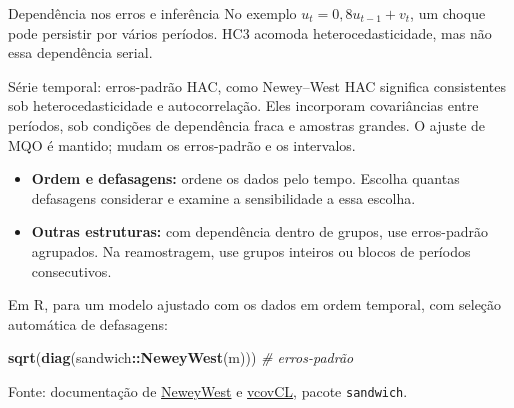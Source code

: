 \documentclass[
  ignorenonframetext,
  brazilian,
  aspectratio=169,
  10pt]{beamer}
\newenvironment{Shaded}{\begin{snugshade}}{\end{snugshade}}
\newcommand{\CommentTok}[1]{\textcolor[rgb]{0.56,0.35,0.01}{\textit{#1}}}
\newcommand{\FunctionTok}[1]{\textcolor[rgb]{0.13,0.29,0.53}{\textbf{#1}}}
\newcommand{\NormalTok}[1]{#1}
\newcommand{\SpecialCharTok}[1]{\textcolor[rgb]{0.81,0.36,0.00}{\textbf{#1}}}
\providecommand{\tightlist}{%
  \setlength{\itemsep}{0pt}\setlength{\parskip}{0pt}}
\begin{document}
\begin{frame}[fragile]{Dependência nos erros e inferência}
\protect{}\label{dependuxeancia-nos-erros-e-inferuxeancia}
No exemplo \(u_t=0{,}8u_{t-1}+v_t\), um choque pode persistir por vários
períodos. HC3 acomoda heterocedasticidade, mas não essa dependência
serial.

\begin{block}{Série temporal: erros-padrão HAC, como Newey--West}
HAC significa consistentes sob heterocedasticidade e autocorrelação.
Eles incorporam covariâncias entre períodos, sob condições de dependência fraca e amostras grandes.
O ajuste de MQO é mantido; mudam os erros-padrão e os intervalos.
\end{block}

\begin{itemize}
\tightlist
\item
  \textbf{Ordem e defasagens:} ordene os dados pelo tempo. Escolha
  quantas defasagens considerar e examine a sensibilidade a essa
  escolha.
\item
  \textbf{Outras estruturas:} com dependência dentro de grupos, use
  erros-padrão agrupados. Na reamostragem, use grupos inteiros ou blocos
  de períodos consecutivos.
\end{itemize}

Em R, para um modelo ajustado com os dados em ordem temporal, com
seleção automática de defasagens:

\begin{Shaded}
\begin{Highlighting}[]
\FunctionTok{sqrt}\NormalTok{(}\FunctionTok{diag}\NormalTok{(sandwich}\SpecialCharTok{::}\FunctionTok{NeweyWest}\NormalTok{(m)))  }\CommentTok{\# erros{-}padrão}
\end{Highlighting}
\end{Shaded}

\scriptsize Fonte: documentação de
\href{https://sandwich.r-forge.r-project.org/reference/NeweyWest.html}{NeweyWest}
e
\href{https://sandwich.r-forge.r-project.org/reference/vcovCL.html}{vcovCL},
pacote \texttt{sandwich}.
\end{frame}
\end{document}
